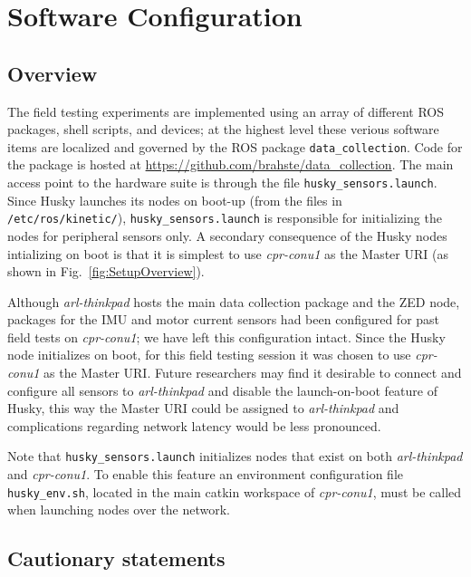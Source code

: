 \documentclass[
	12pt, %
]{fphw}
\newcommand{\code}[1]{\colorbox{light-gray}{\texttt{#1}}}
\begin{document}

\section{Software Configuration}
\label{sec:SoftwareConfiguration}

\subsection{Overview}

The field testing experiments are implemented using an array of different ROS packages, shell scripts, and devices; at the highest level these verious software items are localized and governed by the ROS package \code{data\_collection}. Code for the package is hosted at \url{https://github.com/brahste/data_collection}. The main access point to the hardware suite is through the file \code{husky\_sensors.launch}. Since Husky launches its nodes on boot-up (from the files in \code{/etc/ros/kinetic/}), \code{husky\_sensors.launch} is responsible for initializing the nodes for peripheral sensors only. A secondary consequence of the Husky nodes intializing on boot is that it is simplest to use \emph{cpr-conu1} as the Master URI (as shown in Fig.~\ref{fig:SetupOverview}). 

Although \emph{arl-thinkpad} hosts the main data collection package and the ZED node, packages for the IMU and motor current sensors had been configured for past field tests on \emph{cpr-conu1}; we have left this configuration intact. Since the Husky node initializes on boot, for this field testing session it was chosen to use \emph{cpr-conu1} as the Master URI. Future researchers may find it desirable to connect and configure all sensors to \textit{arl-thinkpad} and disable the launch-on-boot feature of Husky, this way the Master URI could be assigned to \textit{arl-thinkpad} and complications regarding network latency would be less pronounced.

Note that \code{husky\_sensors.launch} initializes nodes that exist on both \emph{arl-thinkpad} and \emph{cpr-conu1}. To enable this feature an environment configuration file \code{husky\_env.sh}, located in the main catkin workspace of \emph{cpr-conu1}, must be called when launching nodes over the network. 

\subsection{Cautionary statements}
\end{document}
